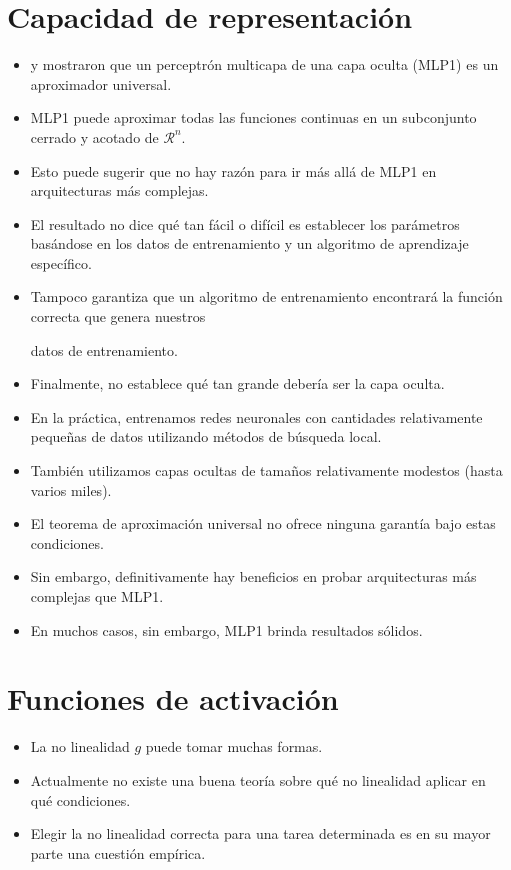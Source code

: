 \section{Capacidad de representación}

\begin{itemize}
\item \cite{hornik1989multilayer} y \cite{cybenko1989approximation} mostraron que un perceptrón multicapa de una capa oculta (MLP1) es un aproximador universal.
\item MLP1 puede aproximar todas las funciones continuas en un subconjunto cerrado y acotado de $\mathcal{R}^n$.
\item Esto puede sugerir que no hay razón para ir más allá de MLP1 en arquitecturas más complejas.
\item El resultado no dice qué tan fácil o difícil es establecer los parámetros basándose en los datos de entrenamiento y un algoritmo de aprendizaje específico.
\item Tampoco garantiza que un algoritmo de entrenamiento encontrará la función correcta que genera nuestros

datos de entrenamiento.
\item Finalmente, no establece qué tan grande debería ser la capa oculta.
\item En la práctica, entrenamos redes neuronales con cantidades relativamente pequeñas de datos utilizando métodos de búsqueda local.
\item También utilizamos capas ocultas de tamaños relativamente modestos (hasta varios miles).
\item El teorema de aproximación universal no ofrece ninguna garantía bajo estas condiciones.
\item Sin embargo, definitivamente hay beneficios en probar arquitecturas más complejas que MLP1.
\item En muchos casos, sin embargo, MLP1 brinda resultados sólidos.
\end{itemize}

\section{Funciones de activación}
\begin{itemize}
\item La no linealidad $g$ puede tomar muchas formas.
\item Actualmente no existe una buena teoría sobre qué no linealidad aplicar en qué condiciones.
\item Elegir la no linealidad correcta para una tarea determinada es en su mayor parte una cuestión empírica.
\end{itemize}

